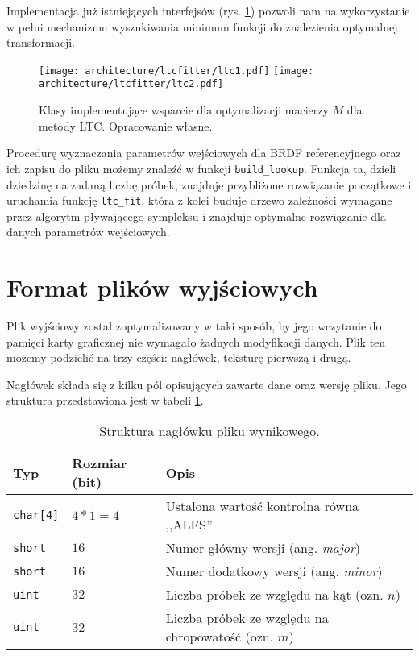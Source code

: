 \documentclass[../main.tex]{subfiles}
\newcommand{\graphvizscale}{0.09}
\begin{document}
Implementacja już istniejących interfejsów (rys. \ref{fig:LTCClassDiagram}) pozwoli nam na wykorzystanie w pełni mechanizmu wyszukiwania minimum funkcji do znalezienia optymalnej transformacji.

\begin{figure}[h]
    \centering
    \texttt{[image: architecture/ltcfitter/ltc1.pdf]}
    \texttt{[image: architecture/ltcfitter/ltc2.pdf]}
    \caption{Klasy implementujące wsparcie dla optymalizacji macierzy $M$ dla metody LTC. Opracowanie własne.}
    \label{fig:LTCClassDiagram}
\end{figure}

Procedurę wyznaczania parametrów wejściowych dla BRDF referencyjnego oraz ich zapisu do pliku możemy znaleźć w funkcji \texttt{build\_lookup}. Funkcja ta, dzieli dziedzinę na zadaną liczbę próbek, znajduje przybliżone rozwiązanie początkowe i uruchamia funkcję \texttt{ltc\_fit}, która z kolei buduje drzewo zależności wymagane przez algorytm pływającego sympleksu i znajduje optymalne rozwiązanie dla danych parametrów wejściowych.

\section{Format plików wyjściowych}

Plik wyjściowy został zoptymalizowany w taki sposób, by jego wczytanie do pamięci karty graficznej nie wymagało żadnych modyfikacji danych. Plik ten możemy podzielić na trzy części: nagłówek, teksturę pierwszą i drugą.

Nagłówek składa się z kilku pól opisujących zawarte dane oraz wersję pliku. Jego struktura przedstawiona jest w tabeli \ref{tab:alf_header}.

\begin{table}[h]
    \centering
    \begin{tabular}{|l|l|l|}
        \hline
        Typ & Rozmiar (bit) & Opis \\ \hline 
        \texttt{char[4]} & $4*1=4$ & Ustalona wartość kontrolna równa ,,ALFS'' \\ \hline
        \texttt{short} & $16$ & Numer główny wersji (ang. \textit{major}) \\ \hline
        \texttt{short} & $16$ & Numer dodatkowy wersji  (ang. \textit{minor}) \\ \hline
        \texttt{uint} & $32$ & Liczba próbek ze względu na kąt (ozn. $n$) \\ \hline
        \texttt{uint} & $32$ & Liczba próbek ze względu na chropowatość (ozn. $m$) \\ \hline
    \end{tabular}
    \caption{Struktura nagłówku pliku wynikowego.}
    \label{tab:alf_header}
\end{table}
\end{document}
